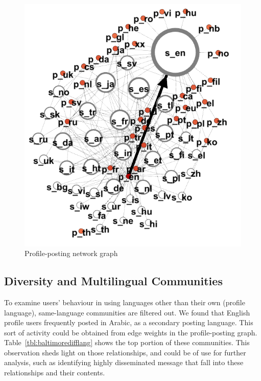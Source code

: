 \begin{figure}[htb]
\centering
\includegraphics[width=\columnwidth]{images/baltimore_p_s_lang_sl.png}
\caption{Profile-posting network graph}
\label{fig:baltimore_p_s_lang_sl}
\end{figure}


\subsection{Diversity and Multilingual Communities}

To examine users' behaviour in using languages other than their own
(profile language), same-language communities are filtered out.  We
found that English profile users frequently posted in Arabic, as a
secondary posting language. This sort of activity could be obtained
from edge weights in the profile-posting
graph. Table~\ref{tbl:baltimoredifflang} shows the top portion of
these communities. This observation sheds light on those
relationships, and could be of use for further analysis, such as
identifying highly disseminated message that fall into these
relationships and their contents.


